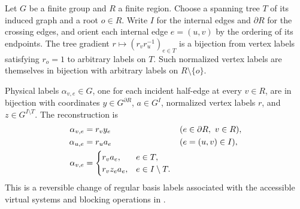 \begin{definition}%
    \label{def:peps_regular_region_coordinates}
    \leanok
    Let $G$ be a finite group and $R$ a finite region. Choose a spanning
    tree $T$ of its induced graph and a root $o\in R$. Write $I$ for the
    internal edges and $\partial R$ for the crossing edges, and orient
    each internal edge $e=(u,v)$ by the ordering of its endpoints.
    The tree gradient $r\mapsto(r_vr_u^{-1})_{e\in T}$ is a bijection
    from vertex labels satisfying $r_o=1$ to arbitrary labels on $T$.
    Such normalized vertex labels are themselves in bijection with
    arbitrary labels on $R\setminus\{o\}$.

    Physical labels $\alpha_{v,e}\in G$, one for each incident half-edge
    at every $v\in R$, are in bijection with coordinates
    $y\in G^{\partial R}$, $a\in G^I$, normalized vertex labels $r$,
    and $z\in G^{I\setminus T}$. The reconstruction is
    \begin{align}
        \alpha_{v,e} & =r_vy_e
                     &         & (e\in\partial R,\ v\in R),
        \label{eq:peps_region_boundary_coordinates}         \\
        \alpha_{u,e} & =r_ua_e
                     &         & (e=(u,v)\in I),\notag      \\
        \alpha_{v,e} & =
        \begin{cases}
            r_va_e,    & e\in T,            \\
            r_vz_ea_e, & e\in I\setminus T.
        \end{cases}
        \label{eq:peps_region_internal_coordinates}
    \end{align}
    This is a reversible change of regular basis labels associated with
    the accessible virtual systems and blocking operations in
    \cite[\S6.2--6.3]{Schuch2010PEPS}.
\end{definition}

